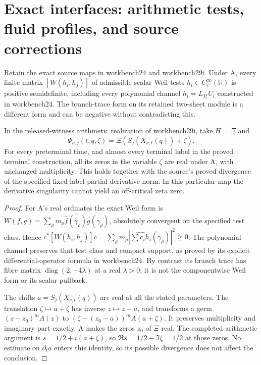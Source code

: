 \section{Exact interfaces: arithmetic tests, fluid profiles, and source corrections}

\begin{proposition}
Retain the exact source maps in workbench24 and workbench29i.
Under A, every finite matrix $[W(h_i,h_j)]$ of admissible scalar
Weil tests $h_i\in C_c^\infty(\mathbb R)$ is positive semidefinite,
including every polynomial channel $h_i=L_{P_i}U_i$ constructed in
workbench24. The branch-trace form on its retained two-sheet module
is a different form and can be negative without contradicting this.

In the released-witness arithmetic realization of workbench29i, take
$H=\Xi$ and
\[
 \Psi_{\nu,j}(t,q,\zeta)
 =\Xi(S_j(X_{\nu,t}(q))+\zeta).
\]
For every preterminal time, and almost every terminal label in the
proved terminal construction, all its zeros in the variable $\zeta$
are real under A, with unchanged multiplicity. This holds together
with the source's proved divergence of the specified fixed-label
partial-derivative norm. In this particular map the derivative
singularity cannot yield an off-critical zeta zero.
\end{proposition}
\begin{proof}
For A's real ordinates the exact Weil form is
$W(f,g)=\sum_\rho m_\rho\overline{\widehat f(\gamma_\rho)}
\widehat g(\gamma_\rho)$, absolutely convergent on the specified
test class. Hence
$c^*[W(h_i,h_j)]c=\sum_\rho m_\rho|
\widehat{\sum c_ih_i}(\gamma_\rho)|^2\ge0$.
The polynomial channel preserves that test class and compact support,
as proved by its explicit differential-operator formula in workbench24.
By contrast its branch trace has fibre matrix
$\operatorname{diag}(2,-4\lambda)$ at a real $\lambda>0$; it is
not the componentwise Weil form or its scalar pullback.

The shifts $a=S_j(X_{\nu,t}(q))$ are real at all the stated parameters.
The translation $\zeta\mapsto a+\zeta$ has inverse $z\mapsto z-a$,
and transforms a germ $(z-z_0)^mA(z)$ to
$(\zeta-(z_0-a))^mA(a+\zeta)$. It preserves multiplicity and
imaginary part exactly. A makes the zeros $z_0$ of $\Xi$ real.
The completed arithmetic argument is $s=1/2+i(a+\zeta)$,
so $\Re s=1/2-\Im\zeta=1/2$ at those zeros.
No estimate on $\partial_ta$ enters this identity, so its possible
divergence does not affect the conclusion.
\end{proof}

